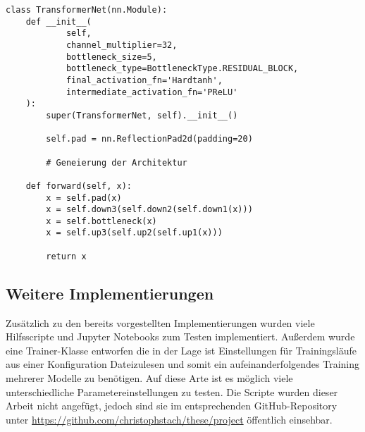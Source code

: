 \begin{listing}[ht]
\begin{verbatim}
class TransformerNet(nn.Module):
    def __init__(
            self,
            channel_multiplier=32,
            bottleneck_size=5,
            bottleneck_type=BottleneckType.RESIDUAL_BLOCK,
            final_activation_fn='Hardtanh',
            intermediate_activation_fn='PReLU'
    ):
        super(TransformerNet, self).__init__()

        self.pad = nn.ReflectionPad2d(padding=20)

        # Geneierung der Architektur

    def forward(self, x):
        x = self.pad(x)
        x = self.down3(self.down2(self.down1(x)))
        x = self.bottleneck(x)
        x = self.up3(self.up2(self.up1(x)))

        return x
\end{verbatim}
\end{listing}

\pagebreak

\subsection{Weitere Implementierungen}

Zusätzlich zu den bereits vorgestellten Implementierungen wurden viele Hilfsscripte und Jupyter Notebooks zum Testen implementiert.
Außerdem wurde eine Trainer-Klasse entworfen die in der Lage ist Einstellungen für Trainingsläufe aus einer Konfiguration Dateizulesen und somit 
ein aufeinanderfolgendes Training mehrerer Modelle zu benötigen. Auf diese Arte ist es möglich viele unterschiedliche Parametereinstellungen zu testen.
Die Scripte wurden dieser Arbeit nicht angefügt, jedoch sind sie im entsprechenden GitHub-Repository unter \url{https://github.com/christophstach/these/project} öffentlich einsehbar.